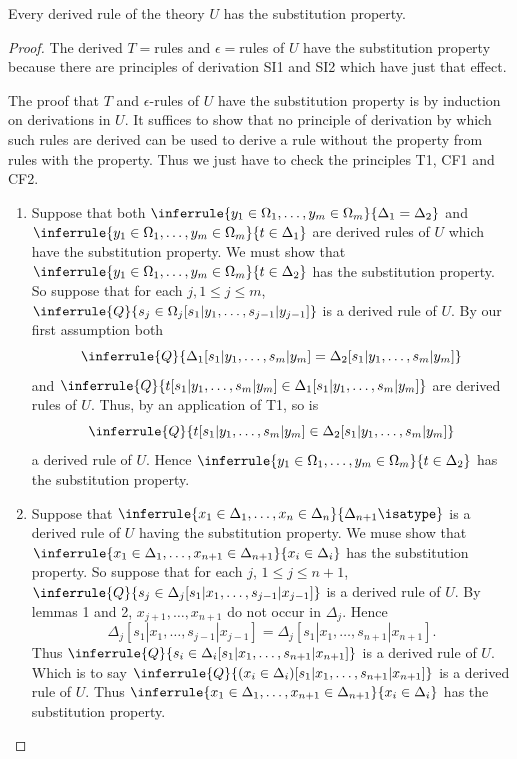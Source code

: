 \begin{lemma}
  Every derived rule of the theory $U$ has the substitution property.
\end{lemma}
\begin{proof}
  The derived $T=$rules and $\epsilon=$rules of $U$ have the substitution property because there are principles of derivation SI1 and SI2 which have just that effect.

  The proof that $T$ and $\epsilon$-rules of $U$ have the substitution property is by induction on derivations in $U$.
  It suffices to show that no principle of derivation by which such rules are derived can be used to derive a rule without the property from rules with the property.
  Thus we just have to check the principles T1, CF1 and CF2.

  \begin{enumerate}
    \item[T1.]
      Suppose that both $\inferrule{y_1\in\Omega_1,\ldots,y_m\in\Omega_m}{\Delta_1=\Delta_2}$ and $\inferrule{y_1\in\Omega_1,\ldots,y_m\in\Omega_m}{t\in\Delta_1}$ are derived rules of $U$ which have the substitution property.
      We must show that $\inferrule{y_1\in\Omega_1,\ldots,y_m\in\Omega_m}{t\in\Delta_2}$ has the substitution property.
      So suppose that for each $j, 1\leq j\leq m$, $\inferrule{Q}{s_j\in\Omega_j[s_1|y_1,\ldots,s_{j-1}|y_{j-1}]}$ is a derived rule of $U$.
      By our first assumption both
      \[\inferrule{Q}{\Delta_1[s_1|y_1,\ldots,s_m|y_m]=\Delta_2[s_1|y_1,\ldots,s_m|y_m]}\] and $\inferrule{Q}{t[s_1|y_1,\ldots,s_m|y_m]\in\Delta_1[s_1|y_1,\ldots,s_m|y_m]}$ are derived rules of $U$.
      Thus, by an application of T1, so is
      \[\inferrule{Q}{t[s_1|y_1,\ldots,s_m|y_m]\in\Delta_2[s_1|y_1,\ldots,s_m|y_m]}\] a derived rule of $U$.
      Hence $\inferrule{y_1\in\Omega_1,\ldots,y_m\in\Omega_m}{t\in\Delta_2}$ has the substitution property.

    \item[CF1.]
      Suppose that $\inferrule{x_1\in\Delta_1,\ldots,x_n\in\Delta_n}{\Delta_{n+1}\isatype}$ is a derived rule of $U$ having the substitution property.
      We muse show that $\inferrule{x_1\in\Delta_1,\ldots,x_{n+1}\in\Delta_{n+1}}{x_i\in\Delta_i}$ has the substitution property.
      So suppose that for each $j$, $1\leq j\leq n+1$, $\inferrule{Q}{s_j\in\Delta_j[s_1|x_1,\ldots,s_{j-1}|x_{j-1}]}$ is a derived rule of $U$.
      By lemmas 1 and 2, $x_{j+1},\ldots,x_{n+1}$ do not occur in $\Delta_j$.
      Hence
      \[\Delta_j[s_1|x_1,\ldots,s_{j-1}|x_{j-1}]=\Delta_j[s_1|x_1,\ldots,s_{n+1}|x_{n+1}].\]
      Thus $\inferrule{Q}{s_i\in\Delta_i[s_1|x_1,\ldots,s_{n+1}|x_{n+1}]}$ is a derived rule of $U$.
      Which is to say $\inferrule{Q}{(x_i\in\Delta_i)[s_1|x_1,\ldots,s_{n+1}|x_{n+1}]}$ is a derived rule of $U$.
      Thus $\inferrule{x_1\in\Delta_1,\ldots,x_{n+1}\in\Delta_{n+1}}{x_i\in\Delta_i}$ has the substitution property.


\end{enumerate}
\end{proof}
